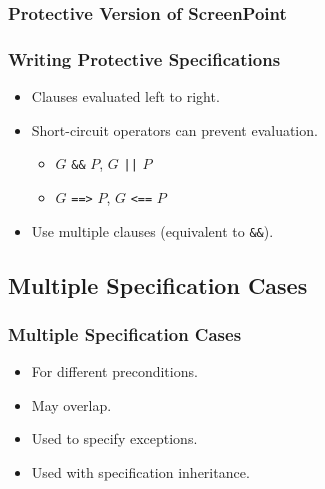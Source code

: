 \begin{frame}
\frametitle{Protective Version of ScreenPoint}

\end{frame}

\begin{frame}[fragile]
\frametitle{Writing Protective Specifications}

\begin{itemize}
\item
Clauses evaluated left to right.

\item
Short-circuit operators can prevent evaluation.
\begin{itemize}
\item
$G$ \lstinline!&&! $P$, $G$ \lstinline!||! $P$

\item
$G$ \lstinline!==>! $P$, $G$ \lstinline!<==! $P$
\end{itemize}

\item
Use multiple clauses (equivalent to \lstinline!&&!).
\end{itemize}
\end{frame}


\subsection[Spec Cases]{Multiple Specification Cases}

\begin{frame}
\frametitle{Multiple Specification Cases}

\begin{itemize}
\item
For different preconditions.

\item
May overlap.

\item
Used to specify exceptions.

\item
Used with specification inheritance.
\end{itemize}
\end{frame}

